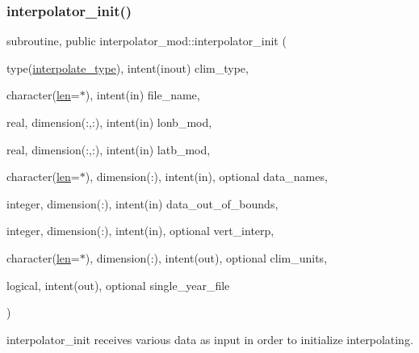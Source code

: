 \subsubsection{\texorpdfstring{interpolator\+\_\+init()}{interpolator\_init()}}
{\footnotesize\ttfamily subroutine, public interpolator\+\_\+mod\+::interpolator\+\_\+init (\begin{DoxyParamCaption}\item[{type(\hyperlink{structinterpolator__mod_1_1interpolate__type}{interpolate\+\_\+type}), intent(inout)}]{clim\+\_\+type,  }\item[{character(\hyperlink{namespaceinterpolator__mod_a6bd2ec3395203e1b6aba0610bfbfe16b}{len}=$\ast$), intent(in)}]{file\+\_\+name,  }\item[{real, dimension(\+:,\+:), intent(in)}]{lonb\+\_\+mod,  }\item[{real, dimension(\+:,\+:), intent(in)}]{latb\+\_\+mod,  }\item[{character(\hyperlink{namespaceinterpolator__mod_a6bd2ec3395203e1b6aba0610bfbfe16b}{len}=$\ast$), dimension(\+:), intent(in), optional}]{data\+\_\+names,  }\item[{integer, dimension(\+:), intent(in)}]{data\+\_\+out\+\_\+of\+\_\+bounds,  }\item[{integer, dimension(\+:), intent(in), optional}]{vert\+\_\+interp,  }\item[{character(\hyperlink{namespaceinterpolator__mod_a6bd2ec3395203e1b6aba0610bfbfe16b}{len}=$\ast$), dimension(\+:), intent(out), optional}]{clim\+\_\+units,  }\item[{logical, intent(out), optional}]{single\+\_\+year\+\_\+file }\end{DoxyParamCaption})}



interpolator\+\_\+init receives various data as input in order to initialize interpolating. 


